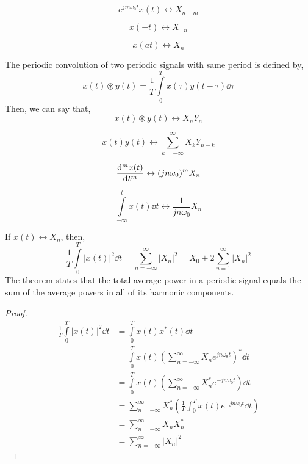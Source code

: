 		\begin{theorem}
			\[e^{jm\omega_0 t}x(t)\leftrightarrow X_{n-m}\]
		\end{theorem}
		\begin{theorem}
			\[x(-t)\leftrightarrow X_{-n}\]
		\end{theorem}
		\begin{theorem}
			\[x(at)\leftrightarrow X_n\]
		\end{theorem}
		\begin{theorem}
			The periodic convolution of two periodic signals with same period is defined by,
			\[x(t)\circledast y(t)=\frac{1}{T}\int\limits_0^T x(\tau)y(t-\tau)\dd{\tau}\]
			Then, we can say that,
			\[x(t)\circledast y(t) \leftrightarrow X_nY_n\]
		\end{theorem}
		\begin{theorem}[Multiplication]
			\[x(t)y(t)\leftrightarrow \sum\limits_{k=-\infty}^\infty X_kY_{n-k}\]
		\end{theorem}
		\begin{theorem}[Differentiation]
			\[\dv[m]{x(t)}{t}\leftrightarrow (jn\omega_0)^mX_n\]
		\end{theorem}
		\begin{theorem}[Integration]
			\[\int\limits_{-\infty}^t x(t)\dd{t}\leftrightarrow \frac{1}{jn\omega_0}X_n\]
		\end{theorem}
		\begin{theorem}
			If $x(t)\leftrightarrow X_n$, then,
			\[\frac{1}{T}\int\limits_0^T |x(t)|^2\dd{t}=\sum\limits_{n=-\infty}^\infty|X_n|^2=X_0+2\sum\limits_{n=1}^\infty|X_n|^2\]
			The theorem states that the total average power in a periodic signal equals the sum of the average powers in all of its harmonic components.
		\end{theorem}
		\begin{proof}
			\[\begin{split}
				\frac{1}{T}\int\limits_0^T |x(t)|^2\dd{t}&=\int\limits_0^T x(t)x^*(t)\dd{t}\\
				&=\int\limits_0^T x(t) \left(\sum\limits_{n=-\infty}^\infty X_ne^{jn\omega_0t}\right)^* \dd{t}\\
				&=\int\limits_0^T x(t) \left(\sum\limits_{n=-\infty}^\infty X^*_ne^{-jn\omega_0t}\right) \dd{t}\\
				&=\sum\limits_{n=-\infty}^\infty X^*_n\left(\frac{1}{T}\int_0^Tx(t)e^{-jn\omega_0t}\dd{t}\right)\\
				&=\sum\limits_{n=-\infty}^\infty X_n X^*_n\\
				&=\sum\limits_{n=-\infty}^\infty|X_n|^2
			\end{split}\]
		\end{proof}
